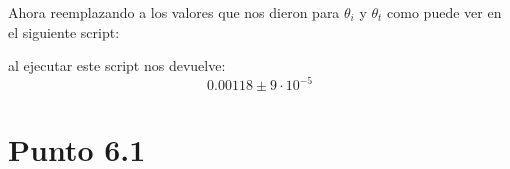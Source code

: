 \documentclass[12pt]{exam}
\begin{document}
Ahora reemplazando a los valores que nos dieron para $\theta_i$ y $\theta_t$ como puede ver en el siguiente script:



al ejecutar este script nos devuelve:
\begin{equation*}
  0.00118 \pm 9 \cdot 10^{-5}
\end{equation*}

\section{Punto 6.1}
\end{document}
